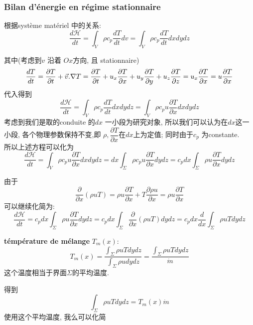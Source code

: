 \documentclass{article}
\begin{document}
\subsubsection{Bilan d'\'energie en r\'egime stationnaire}
根据syst\`eme mat\'eriel 中的关系:
\begin{equation}
\dfrac{d \mathcal{H}}{dt}
= \int_V \rho c_p\frac{dT}{dt}dv
= \int_V \rho c_p\frac{dT}{dt}dxdydz
\end{equation}

其中(考虑到$v$ 沿着 $Ox$方向, 且 stationnaire)
$$
\dfrac{dT}{dt}
= \frac{\partial T}{\partial t} + \vec{v} . \nabla T
= \frac{\partial T}{\partial t} + u_x \frac{\partial T}{\partial x} + u_y \frac{\partial T}{\partial y} + u_z \frac{\partial T}{\partial z}
= u_x \frac{\partial T}{\partial x}
= u \frac{\partial T}{\partial x}
$$
代入\lasteq 得到
\begin{equation}
\dfrac{d \mathcal{H}}{dt}
= \int_V \rho c_p\frac{dT}{dt}dxdydz
= \int_V \rho c_p u \frac{\partial T}{\partial x} dxdydz
\end{equation}
考虑到我们是取的conduite 的$dx$ 一小段为研究对象, 所以我们可以认为在$dx$这一小段, 各个物理参数保持不变,即 $\rho, \dfrac{\partial T}{\partial x}$在$dx$上为定值; 同时由于$c_p$ 为constante.\\
所以上述方程\lasteq 可以化为
\begin{equation}
\dfrac{d \mathcal{H}}{dt}
= \int_V \rho c_p u \frac{\partial T}{\partial x} dxdydz
= dx \int_\Sigma \rho c_p u \frac{\partial T}{\partial x} dydz
= c_p dx \int_\Sigma \rho u \frac{\partial T}{\partial x} dydz
\end{equation}

由于
$$
\frac{\partial}{\partial x}(\rho u T)
= \rho u \frac{\partial T}{\partial x} + T \frac{\partial \rho u}{\partial x}
= \rho u \dfrac{\partial T}{\partial x}
$$
\lasteq 可以继续化简为:
\begin{equation}
\dfrac{d \mathcal{H}}{dt}
= c_p dx \int_\Sigma \rho u \frac{\partial T}{\partial x} dydz
= c_p dx \int_\Sigma \frac{\partial}{\partial x}(\rho u T) dydz
= c_p dx \dfrac{d}{dx}\int_\Sigma \rho u T dydz
\end{equation}

\textbf{t\'emp\'erature de m\'elange} $T_m(x)$:
$$
T_m(x) 
= \dfrac{\int_\Sigma \rho u T dydz}{\int_\Sigma \rho u dydz}
= \dfrac{\int_\Sigma \rho u T dydz}{\dot{m}}
$$
这个温度相当于界面$\Sigma$的平均温度.

得到
$$\int_\Sigma \rho u T dydz = T_m(x) \dot{m} $$
使用这个平均温度, 我么可以化简\lasteq
\end{document}
